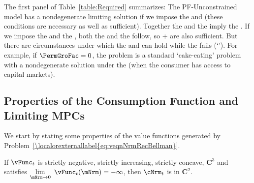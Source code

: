 \documentclass[\econtexRoot/BufferStockTheory]{subfiles}
\begin{document}
The first panel of Table~\ref{table:Required} summarizes: The PF-Unconstrained model has a nondegenerate limiting solution if we impose the {\RIC} and {\FHWC} (these conditions are necessary as well as sufficient).  Together the {\PFFVAC} and the {\FHWC} imply the {\RIC}.  If we impose the {\GICRaw} and the {\FHWC}, both the {\PFFVAC} and the {\RIC} follow, so {\GICRaw}+{\FHWC} are also sufficient.  But there are circumstances under which the {\RIC} and {\FHWC} can hold while the {\PFFVAC} fails (`\cncl{\PFFVAC}').  For example, if $\PermGroFac=0$, the problem is a standard `cake-eating' problem with a nondegenerate solution under the {\RIC} (when the consumer has access to capital markets).%



\subsection{Properties of the Consumption Function and Limiting MPCs}\label{sec:MPCiterproofs}


We start by stating some properties of the value functions generated by Problem~\eqref{\localorexternallabel{eq:veqnNrmRecBellman}}.  


\begin{lemma}\label{lemm:consC2}
If $\vFunc_{t}$ is strictly negative, strictly increasing, strictly concave, $\mathbf{C}^{3}$ and satisfies $\lim\limits_{\mNrm\rightarrow 0}~\vFunc_{t}(\mNrm) =-\infty $, then $\cNrm_{t}$ is in $\mathbf{C}^{2}$. 
\end{lemma}
\end{document}
